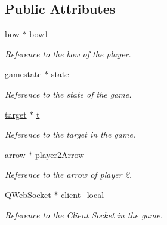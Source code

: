 \subsection*{Public Attributes}
\begin{DoxyCompactItemize}
\item 
\mbox{\label{classmyplayer1_ab0cafd2fa2aa3e035a614971cc6a362e}} 
\hyperlink{classbow}{bow} $\ast$ \hyperlink{classmyplayer1_ab0cafd2fa2aa3e035a614971cc6a362e}{bow1}
\begin{DoxyCompactList}\small\item\em Reference to the bow of the player. \end{DoxyCompactList}\item 
\mbox{\label{classmyplayer1_a507ebf8c50ae21fe3c8b0a89dd27713a}} 
\hyperlink{classgamestate}{gamestate} $\ast$ \hyperlink{classmyplayer1_a507ebf8c50ae21fe3c8b0a89dd27713a}{state}
\begin{DoxyCompactList}\small\item\em Reference to the state of the game. \end{DoxyCompactList}\item 
\mbox{\label{classmyplayer1_aedcf8f8e414e01203289b4ba6355bf01}} 
\hyperlink{classtarget}{target} $\ast$ \hyperlink{classmyplayer1_aedcf8f8e414e01203289b4ba6355bf01}{t}
\begin{DoxyCompactList}\small\item\em Reference to the target in the game. \end{DoxyCompactList}\item 
\mbox{\label{classmyplayer1_ae95fc3dcaf03caa5fdfb1deb5ecc5c5c}} 
\hyperlink{classarrow}{arrow} $\ast$ \hyperlink{classmyplayer1_ae95fc3dcaf03caa5fdfb1deb5ecc5c5c}{player2\+Arrow}
\begin{DoxyCompactList}\small\item\em Reference to the arrow of player 2. \end{DoxyCompactList}\item 
\mbox{\label{classmyplayer1_a58c818ae137860bfdd64197e37f25371}} 
Q\+Web\+Socket $\ast$ \hyperlink{classmyplayer1_a58c818ae137860bfdd64197e37f25371}{client\+\_\+local}
\begin{DoxyCompactList}\small\item\em Reference to the Client Socket in the game. \end{DoxyCompactList}\end{DoxyCompactItemize}


